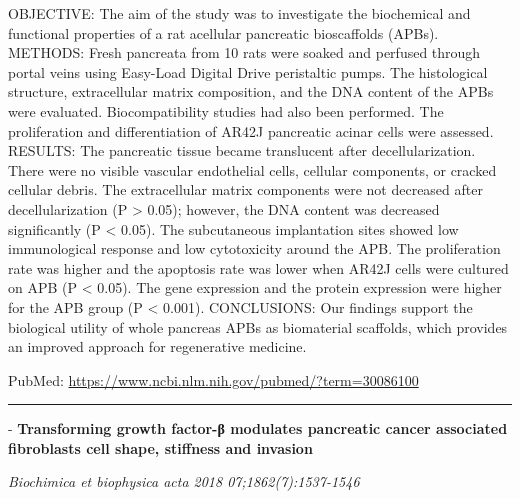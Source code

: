 \documentclass[]{article}
\begin{document}
OBJECTIVE: The aim of the study was to investigate the biochemical and
functional properties of a rat acellular pancreatic bioscaffolds (APBs).
METHODS: Fresh pancreata from 10 rats were soaked and perfused through
portal veins using Easy-Load Digital Drive peristaltic pumps. The
histological structure, extracellular matrix composition, and the DNA
content of the APBs were evaluated. Biocompatibility studies had also
been performed. The proliferation and differentiation of AR42J
pancreatic acinar cells were assessed. RESULTS: The pancreatic tissue
became translucent after decellularization. There were no visible
vascular endothelial cells, cellular components, or cracked cellular
debris. The extracellular matrix components were not decreased after
decellularization (P \textgreater{} 0.05); however, the DNA content was
decreased significantly (P \textless{} 0.05). The subcutaneous
implantation sites showed low immunological response and low
cytotoxicity around the APB. The proliferation rate was higher and the
apoptosis rate was lower when AR42J cells were cultured on APB (P
\textless{} 0.05). The gene expression and the protein expression were
higher for the APB group (P \textless{} 0.001). CONCLUSIONS: Our
findings support the biological utility of whole pancreas APBs as
biomaterial scaffolds, which provides an improved approach for
regenerative medicine.

PubMed: \url{https://www.ncbi.nlm.nih.gov/pubmed/?term=30086100}

{}

{}

\begin{center}\rule{0.5\linewidth}{\linethickness}\end{center}

 - \textbf{Transforming growth factor-β modulates pancreatic cancer
associated fibroblasts cell shape, stiffness and invasion}

\emph{Biochimica et biophysica acta 2018 07;1862(7):1537-1546}
\end{document}
